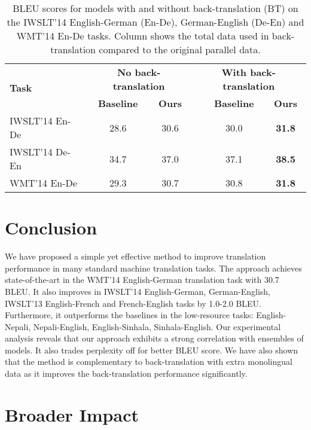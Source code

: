 \documentclass{article}
\begin{document}
\begin{table}[hbt!]
\vspace{-0.5em}
\begin{center}
\caption{BLEU scores for models with and without back-translation (BT) on the IWSLT'14 English-German (En-De), German-English (De-En) and WMT'14 En-De tasks. Column  shows the total data used in back-translation compared to the original parallel data.}
\begin{tabular}{lccccc}
\toprule
\multirow{2}{*}{\bf Task}   & \multicolumn{2}{c}{\bf No back-translation}     & \multicolumn{3}{c}{\bf With back-translation} \\
\cmidrule{2-6}
{}                      & {\bf Baseline}    & {\bf Ours}    & {\bf } & {\bf Baseline}  & {\bf Ours} \\
\midrule
IWSLT'14 En-De	& 28.6	& 30.6	&    & 30.0 & \textbf{31.8}\\
IWSLT'14 De-En	& 34.7	& 37.0	&    & 37.1  & \textbf{38.5}\\
\midrule
WMT'14 En-De   & 29.3  & 30.7  &     & 30.8  & \textbf{31.8}\\
\bottomrule
\end{tabular}
\vspace{-1em}
\label{table:compare_bt}
\end{center}
\end{table}

 
\section{Conclusion} \label{sec:conclusion}

We have proposed a simple yet effective method to improve translation performance in many standard machine translation tasks. 
The approach achieves state-of-the-art in the WMT'14 English-German translation task with 30.7 BLEU. It also improves in IWSLT'14 English-German, German-English, IWSLT'13 English-French and French-English tasks by 1.0-2.0 BLEU. Furthermore, it outperforms the baselines in the low-resource tasks: English-Nepali, Nepali-English, English-Sinhala, Sinhala-English. Our experimental analysis reveals that our approach exhibits a strong correlation with ensembles of models. It also trades perplexity off for better BLEU score. We have also shown that the method is complementary to back-translation with extra monolingual data as it improves the back-translation performance significantly.

\section*{Broader Impact}
\end{document}
